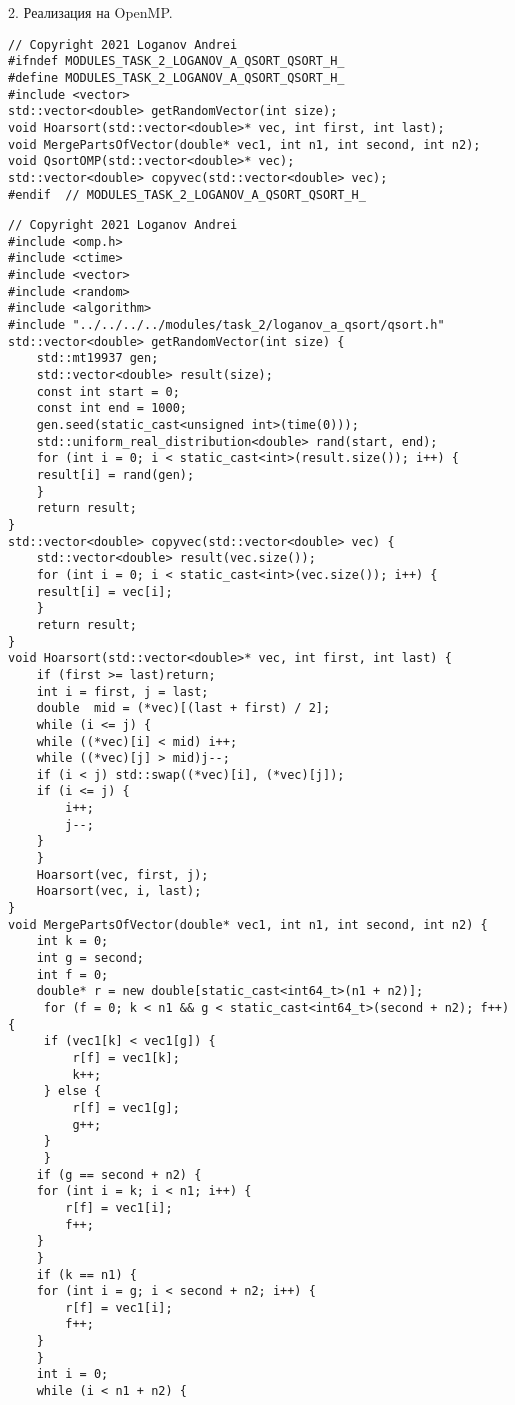\documentclass{report}
\begin{document}
\par 2. Реализация на OpenMP.
\begin{lstlisting}
// Copyright 2021 Loganov Andrei
#ifndef MODULES_TASK_2_LOGANOV_A_QSORT_QSORT_H_
#define MODULES_TASK_2_LOGANOV_A_QSORT_QSORT_H_
#include <vector>
std::vector<double> getRandomVector(int size);
void Hoarsort(std::vector<double>* vec, int first, int last);
void MergePartsOfVector(double* vec1, int n1, int second, int n2);
void QsortOMP(std::vector<double>* vec);
std::vector<double> copyvec(std::vector<double> vec);
#endif  // MODULES_TASK_2_LOGANOV_A_QSORT_QSORT_H_

\end{lstlisting}
\begin{lstlisting}
// Copyright 2021 Loganov Andrei
#include <omp.h>
#include <ctime>
#include <vector>
#include <random>
#include <algorithm>
#include "../../../../modules/task_2/loganov_a_qsort/qsort.h"
std::vector<double> getRandomVector(int size) {
    std::mt19937 gen;
    std::vector<double> result(size);
    const int start = 0;
    const int end = 1000;
    gen.seed(static_cast<unsigned int>(time(0)));
    std::uniform_real_distribution<double> rand(start, end);
    for (int i = 0; i < static_cast<int>(result.size()); i++) {
    result[i] = rand(gen);
    }
    return result;
}
std::vector<double> copyvec(std::vector<double> vec) {
    std::vector<double> result(vec.size());
    for (int i = 0; i < static_cast<int>(vec.size()); i++) {
    result[i] = vec[i];
    }
    return result;
}
void Hoarsort(std::vector<double>* vec, int first, int last) {
    if (first >= last)return;
    int i = first, j = last;
    double  mid = (*vec)[(last + first) / 2];
    while (i <= j) {
    while ((*vec)[i] < mid) i++;
    while ((*vec)[j] > mid)j--;
    if (i < j) std::swap((*vec)[i], (*vec)[j]);
    if (i <= j) {
        i++;
        j--;
    }
    }
    Hoarsort(vec, first, j);
    Hoarsort(vec, i, last);
}
void MergePartsOfVector(double* vec1, int n1, int second, int n2) {
    int k = 0;
    int g = second;
    int f = 0;
    double* r = new double[static_cast<int64_t>(n1 + n2)];
     for (f = 0; k < n1 && g < static_cast<int64_t>(second + n2); f++) {
     if (vec1[k] < vec1[g]) {
         r[f] = vec1[k];
         k++;
     } else {
         r[f] = vec1[g];
         g++;
     }
     }
    if (g == second + n2) {
    for (int i = k; i < n1; i++) {
        r[f] = vec1[i];
        f++;
    }
    }
    if (k == n1) {
    for (int i = g; i < second + n2; i++) {
        r[f] = vec1[i];
        f++;
    }
    }
    int i = 0;
    while (i < n1 + n2) {

\end{lstlisting}
\end{document}

